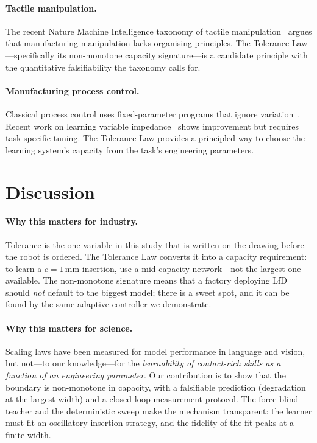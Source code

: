 \documentclass[11pt]{article}
\begin{document}
\paragraph{Tactile manipulation.}
The recent Nature Machine Intelligence taxonomy of tactile
manipulation~\citep{johannsmeier2025tactile} argues that manufacturing
manipulation lacks organising principles. The Tolerance Law---specifically
its non-monotone capacity signature---is a candidate principle with the
quantitative falsifiability the taxonomy calls for.

\paragraph{Manufacturing process control.}
Classical process control uses fixed-parameter programs that ignore
variation~\citep{hogan1985impedance}. Recent work on learning variable
impedance~\citep{li2020learning} shows improvement but requires task-specific
tuning. The Tolerance Law provides a principled way to choose the learning
system's capacity from the task's engineering parameters.

\section{Discussion}

\paragraph{Why this matters for industry.}
Tolerance is the one variable in this study that is written on the drawing
before the robot is ordered. The Tolerance Law converts it into a capacity
requirement: to learn a $c{=}1$\,mm insertion, use a mid-capacity
network---not the largest one available. The non-monotone signature means
that a factory deploying LfD should \emph{not} default to the biggest model;
there is a sweet spot, and it can be found by the same adaptive controller
we demonstrate.

\paragraph{Why this matters for science.}
Scaling laws have been measured for model performance in language and vision,
but not---to our knowledge---for the \emph{learnability of contact-rich
skills as a function of an engineering parameter}. Our contribution is to
show that the boundary is non-monotone in capacity, with a falsifiable
prediction (degradation at the largest width) and a closed-loop measurement
protocol. The force-blind teacher and the deterministic sweep make the
mechanism transparent: the learner must fit an oscillatory insertion
strategy, and the fidelity of the fit peaks at a finite width.
\end{document}
